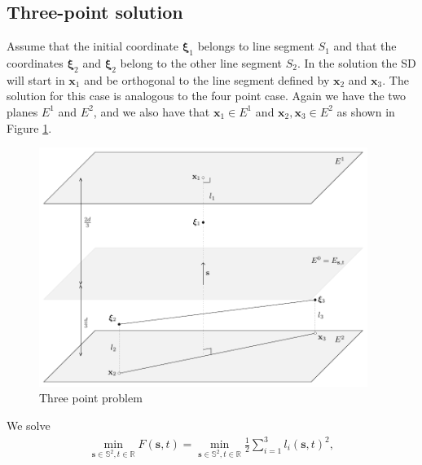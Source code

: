 \subsection{Three-point solution}
Assume that the initial coordinate $\boldsymbol{\xi}_1$ belongs to line segment $S_1$
and that the coordinates $\boldsymbol{\xi}_2$ and $\boldsymbol{\xi}_2$ belong to the
other line segment $S_2$.
In the solution the SD will start in $\textbf{x}_1$ and be orthogonal to the line
segment defined by $\textbf{x}_2$ and $\textbf{x}_3$. The solution for this case is 
analogous to the four point case. Again we have the two planes $E^1$ and $E^2$, 
and we also have that $\textbf{x}_1 \in E^1$ and $\textbf{x}_2, \textbf{x}_3 \in E^2$ as shown in 
Figure \ref{fig:three_point_problem}.
%
\begin{figure}[H]
	\centering
	\includegraphics[width=0.95\textwidth]{figures/constraint_handling/three_point_interwell_problem.pdf}
	\caption{Three point problem}
	\label{fig:three_point_problem}
\end{figure}
%
We solve
\begin{align}
\min_{ \textbf{s} \in \mathbb{S}^2, t \in \mathbb{R}} F(\textbf{s},t) = \min_{ \textbf{s} \in \mathbb{S}^2, t \in \mathbb{R}}  \frac{1}{2} \sum_{i=1}^3 l_i(\textbf{s},t)^2,
\label{interwell_3point_problem}
\end{align}

